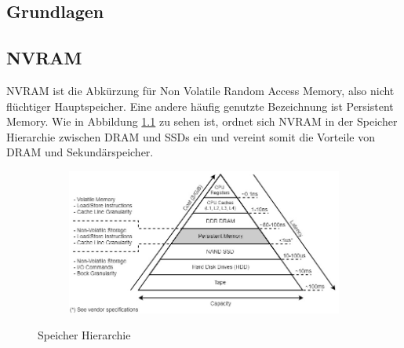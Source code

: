 \documentclass{class/thesis}
\begin{document}
\begin{thesis}
	
	

	\chapter{Grundlagen}
	
	\section{NVRAM}
	NVRAM ist die Abkürzung für \glqq{}Non Volatile Random Access Memory\grqq{}, also nicht flüchtiger Hauptspeicher. Eine andere häufig genutzte Bezeichnung ist \glqq{}Persistent Memory\grqq{}.
	Wie in Abbildung \ref{bildSpeicherHierarchie} zu sehen ist, ordnet sich NVRAM in der Speicher Hierarchie zwischen DRAM und SSDs ein und vereint somit die Vorteile von DRAM und Sekundärspeicher.
	
	\begin{figure}[h]
		\centering
		\begin{subfigure}[b]{1.0\textwidth}
			\includegraphics[width=1.0\linewidth]{img/pmem_storage_pyramid}
		\end{subfigure}
		\caption{Speicher Hierarchie \cite{PMEM.IO:Introduction}}
		\label{bildSpeicherHierarchie}
	\end{figure}
	

\end{thesis}
\end{document}

